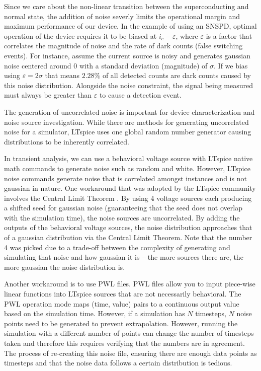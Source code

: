\documentclass[]{article}
\newcommand{\cf}[1]{\textsf{#1}}
\begin{document}
Since we care about the non-linear transition between
the superconducting and normal state, the addition of noise severly limits the operational margin and
maximum performance of our device. In the example of using an SNSPD, optimal operation of the device 
requires it to be biased at $i_c-\varepsilon$, where $\varepsilon$ is a factor that correlates the 
magnitude of noise and the rate of dark counts (false switching events). For instance, assume the current source is noisy and generates
gaussian noise centered around $0$ with a standard deviation (magnitude) of $\sigma$.
If we bias using $\varepsilon = 2\sigma$ that means $2.28\%$ of all detected counts are dark counts caused by this noise distribution.
Alongside the noise constraint, the signal being measured 
must always be greater than $\varepsilon$ to cause a detection event.

The generation of uncorrelated noise is important for device characterization and
noise source investigation.
While there are methods for generating uncorrelated noise for a simulator, 
LTspice uses one global random number generator causing distributions to be 
inherently correlated.

In transient analysis, we can use a behavioral voltage source with LTspice native math commands
to generate noise such as \cf{random} and \cf{white}. However, LTspice noise commands
generate noise that is correlated amongst instances and is not gaussian in nature. One workaround that was
adopted by the LTspice community involves the Central Limit Theorem \cite{CLM-ltspice}. By using 4 voltage sources each producing a shifted seed for 
gaussian noise (guaranteeing that the seed does not overlap with the simulation time),
the noise sources are uncorrelated. By adding the
outputs of the behavioral voltage sources, the noise distribution approaches that of
a gaussian distribution via the Central Limit Theorem. Note that the number 4 was picked due to a trade-off between the complexity of generating and simulating
that noise and how gaussian it is -- the more sources there are, the more gaussian the noise distribution is.

Another workaround is to use PWL files. PWL files allow you to input piece-wise linear functions into LTspice
sources that are not necessarily behavioral. The PWL operation mode maps (time, value) pairs to a continuous 
output value based on the simulation time. However, if a simulation has $N$ timesteps, $N$ noise points need to be generated to prevent extrapolation.
However, running the simulation with a different number of points can change the number
of timesteps taken and therefore this requires verifying that the numbers are in agreement.
The process of re-creating this noise file, ensuring there are enough data points as timesteps and that the noise data follows a certain distribution is tedious.
\end{document}
